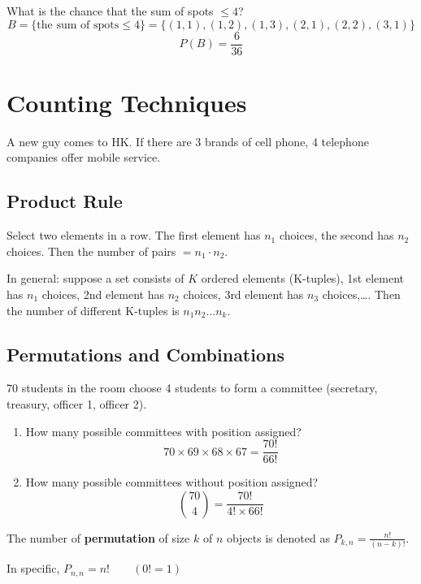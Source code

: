 \begin{exmp}
What is the chance that the sum of spots $\leq 4$?
\[B=\{\text{the sum of spots}\leq 4\}=\{(1,1),(1,2),(1,3),(2,1),(2,2),(3,1)\}\]
\[P(B)=\frac{6}{36}\]
\end{exmp}

\section{Counting Techniques}
\begin{exmp}
A new guy comes to HK. If there are 3 brands of cell phone, 4 telephone companies offer mobile service.

\end{exmp}

\subsection{Product Rule}
Select two elements in a row. The first element has $n_1$ choices, the second has $n_2$ choices. Then the number of pairs $ = n_1 \cdot n_2$.

In general: suppose a set consists of $K$ ordered elements (K-tuples), 1st element has $n_1$ choices, 2nd element has $n_2$ choices, 3rd element has $n_3$ choices,\dots. Then the number of different K-tuples is $n_1 n_2 \dots n_k$.


\subsection{Permutations and Combinations}
\begin{exmp}
70 students in the room choose 4 students to form a committee (secretary, treasury, officer 1, officer 2).
\begin{enumerate}
\item How many possible committees with position assigned?
\[70 \times 69 \times 68 \times 67=\frac{70!}{66!} \]
\item How many possible committees without position assigned?
\[\binom{70}{4}=\frac{70!}{4! \times 66!}\]
\end{enumerate}
\end{exmp}

\begin{defn}
The number of \textbf{permutation} of size $k$ of $n$ objects is denoted as $P_{k,n}=\frac{n!}{(n-k)!}$.

In specific, $P_{n,n}=n!\qquad (0!=1)$
\end{defn}

